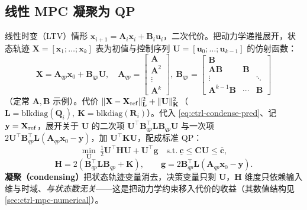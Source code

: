 \subsection{线性 MPC 凝聚为 QP}
\label{sec:ctrl-mpc-qp}

线性时变（LTV）情形 $\mathbf{x}_{i+1}=\mathbf{A}_i\mathbf{x}_i+\mathbf{B}_i\mathbf{u}_i$，二次代价。把动力学递推展开，状态轨迹 $\mathbf{X}=[\mathbf{x}_1;\dots;\mathbf{x}_k]$ 表为初值与控制序列 $\mathbf{U}=[\mathbf{u}_0;\dots;\mathbf{u}_{k-1}]$ 的仿射函数\cite{dicarlo2018cheetah}：
\begin{equation}
  \mathbf{X}=\mathbf{A}_{qp}\mathbf{x}_0+\mathbf{B}_{qp}\mathbf{U},\quad
  \mathbf{A}_{qp}=\begin{bmatrix}\mathbf{A}\\\mathbf{A}^2\\\vdots\\\mathbf{A}^k\end{bmatrix},\
  \mathbf{B}_{qp}=\begin{bmatrix}\mathbf{B}&&\\\mathbf{A}\mathbf{B}&\mathbf{B}&\\\vdots&&\ddots\\\mathbf{A}^{k-1}\mathbf{B}&\cdots&\mathbf{B}\end{bmatrix}
  \label{eq:ctrl-condense-pred}
\end{equation}
（定常 $\mathbf{A},\mathbf{B}$ 示例）。代价 $\|\mathbf{X}-\mathbf{X}_{\rm ref}\|_{\mathbf{L}}^2+\|\mathbf{U}\|_{\mathbf{K}}^2$（$\mathbf{L}=\mathrm{blkdiag}(\mathbf{Q}_i),\ \mathbf{K}=\mathrm{blkdiag}(\mathbf{R}_i)$）。代入 \cref{eq:ctrl-condense-pred}、记 $\mathbf{y}=\mathbf{X}_{\rm ref}$，展开关于 $\mathbf{U}$ 的二次项 $\mathbf{U}^\top\mathbf{B}_{qp}^\top\mathbf{L}\mathbf{B}_{qp}\mathbf{U}$ 与一次项 $2\mathbf{U}^\top\mathbf{B}_{qp}^\top\mathbf{L}(\mathbf{A}_{qp}\mathbf{x}_0-\mathbf{y})$，加 $\mathbf{U}^\top\mathbf{K}\mathbf{U}$，配成标准 QP\cite{dicarlo2018cheetah}：
\begin{equation}
  \min_{\mathbf{U}}\ \tfrac12\mathbf{U}^\top\mathbf{H}\mathbf{U}+\mathbf{U}^\top\mathbf{g}\quad\text{s.t.}\ \underline{\mathbf{c}}\le\mathbf{C}\mathbf{U}\le\overline{\mathbf{c}},
  \label{eq:ctrl-mpc-qpform}
\end{equation}
\begin{equation}
  \mathbf{H}=2(\mathbf{B}_{qp}^\top\mathbf{L}\mathbf{B}_{qp}+\mathbf{K}),\qquad
  \mathbf{g}=2\mathbf{B}_{qp}^\top\mathbf{L}(\mathbf{A}_{qp}\mathbf{x}_0-\mathbf{y}).
  \label{eq:ctrl-mpc-Hg}
\end{equation}
\textbf{凝聚（condensing）}把状态轨迹变量消去，决策变量只剩 $\mathbf{U}$，$\mathbf{H}$ 维度只依赖输入维与时域、\emph{与状态数无关}——这是把动力学约束移入代价的收益（其数值结构见 \cref{sec:ctrl-mpc-numerical}）。

